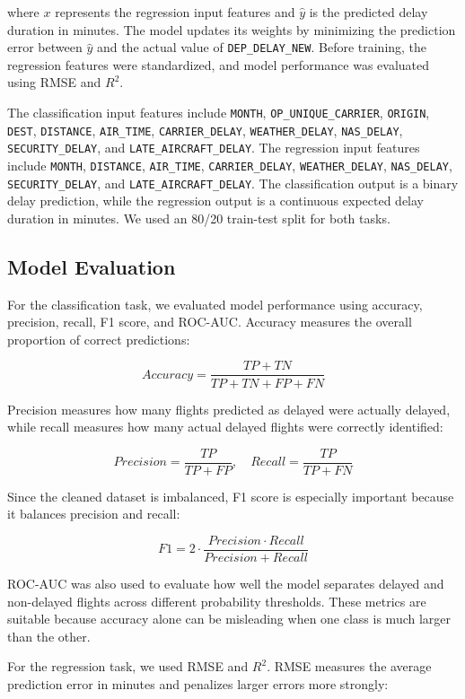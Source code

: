 where \(x\) represents the regression input features and \(\hat{y}\) is the predicted delay duration in minutes. The model updates its weights by minimizing the prediction error between \(\hat{y}\) and the actual value of \texttt{DEP\_DELAY\_NEW}. Before training, the regression features were standardized, and model performance was evaluated using RMSE and \(R^2\).

The classification input features include \texttt{MONTH}, \texttt{OP\_UNIQUE\_CARRIER}, \texttt{ORIGIN}, \texttt{DEST}, \texttt{DISTANCE}, \texttt{AIR\_TIME}, \texttt{CARRIER\_DELAY}, \texttt{WEATHER\_DELAY}, \texttt{NAS\_DELAY}, \texttt{SECURITY\_DELAY}, and \texttt{LATE\_AIRCRAFT\_DELAY}. The regression input features include \texttt{MONTH}, \texttt{DISTANCE}, \texttt{AIR\_TIME}, \texttt{CARRIER\_DELAY}, \texttt{WEATHER\_DELAY}, \texttt{NAS\_DELAY}, \texttt{SECURITY\_DELAY}, and \texttt{LATE\_AIRCRAFT\_DELAY}. The classification output is a binary delay prediction, while the regression output is a continuous expected delay duration in minutes. We used an 80/20 train-test split for both tasks.


\subsection{Model Evaluation} 

For the classification task, we evaluated model performance using accuracy, precision, recall, F1 score, and ROC-AUC. Accuracy measures the overall proportion of correct predictions:

\[
Accuracy=\frac{TP+TN}{TP+TN+FP+FN}
\]

Precision measures how many flights predicted as delayed were actually delayed, while recall measures how many actual delayed flights were correctly identified:

\[
Precision=\frac{TP}{TP+FP}, \quad Recall=\frac{TP}{TP+FN}
\]

Since the cleaned dataset is imbalanced, F1 score is especially important because it balances precision and recall:

\[
F1=2\cdot\frac{Precision\cdot Recall}{Precision+Recall}
\]

ROC-AUC was also used to evaluate how well the model separates delayed and non-delayed flights across different probability thresholds. These metrics are suitable because accuracy alone can be misleading when one class is much larger than the other.

For the regression task, we used RMSE and \(R^2\). RMSE measures the average prediction error in minutes and penalizes larger errors more strongly:

